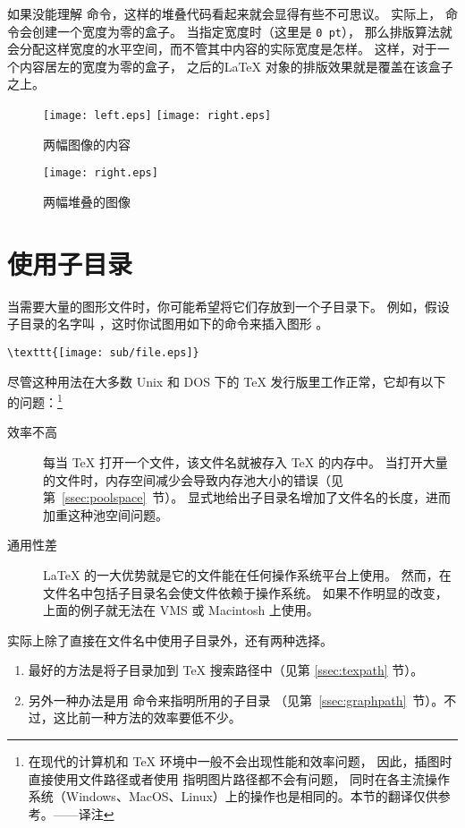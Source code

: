 如果没能理解  命令，这样的堆叠代码看起来就会显得有些不可思议。
实际上， 命令会创建一个宽度为零的盒子。
当指定宽度时（这里是 \texttt{0 pt}），
那么排版算法就会分配这样宽度的水平空间，而不管其中内容的实际宽度是怎样。
这样，对于一个内容居左的宽度为零的盒子，
之后的\LaTeX{} 对象的排版效果就是覆盖在该盒子之上。

\begin{figure}
	\centering
	\texttt{[image: left.eps]}
	\texttt{[image: right.eps]}
	\caption{两幅图像的内容}\label{fig:leftright}
\end{figure}
\begin{figure}
	\centering
	\texttt{[image: right.eps]}
	\caption{两幅堆叠的图像}\label{fig:leftrightoverlay}
\end{figure}

\section{使用子目录}\label{sec:subdir}

当需要大量的图形文件时，你可能希望将它们存放到一个子目录下。
例如，假设子目录的名字叫 ，这时你试图用如下的命令来插入图形 。
\begin{lstlisting}
\texttt{[image: sub/file.eps]}
\end{lstlisting}

尽管这种用法在大多数 Unix 和 DOS 下的 \TeX{} 发行版里工作正常，它却有以下的问题：\footnote{
在现代的计算机和 \TeX{} 环境中一般不会出现性能和效率问题，
因此，插图时直接使用文件路径或者使用   指明图片路径都不会有问题，
同时在各主流操作系统（Windows、MacOS、Linux）上的操作也是相同的。本节的翻译仅供参考。——译注}
\begin{description}
	\item [效率不高]
	
	每当 \TeX{} 打开一个文件，该文件名就被存入 \TeX{} 的内存中。
	当打开大量的文件时，内存空间减少会导致内存池大小的错误（见第~\ref{ssec:poolspace}~节）。
	显式地给出子目录名增加了文件名的长度，进而加重这种池空间问题。
	
	\item [通用性差]
	
	\LaTeX{} 的一大优势就是它的文件能在任何操作系统平台上使用。
	然而，在文件名中包括子目录名会使文件依赖于操作系统。
	如果不作明显的改变，上面的例子就无法在 VMS 或 Macintosh 上使用。
\end{description}
实际上除了直接在文件名中使用子目录外，还有两种选择。
\begin{enumerate}
	\item 最好的方法是将子目录加到 \TeX{} 搜索路径中（见第 \ref{ssec:texpath} 节）。
	\item 另外一种办法是用  命令来指明所用的子目录
	（见第~\ref{ssec:graphpath}~节）。不过，这比前一种方法的效率要低不少。
\end{enumerate}


